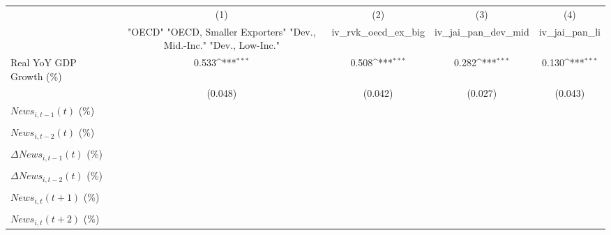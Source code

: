 {
\def\sym#1{\ifmmode^{#1}\else\(^{#1}\)\fi}
\begin{tabular}{l*{4}{c}}
\toprule
                    &\multicolumn{1}{c}{(1)}&\multicolumn{1}{c}{(2)}&\multicolumn{1}{c}{(3)}&\multicolumn{1}{c}{(4)}\\
                    &\multicolumn{1}{c}{ "OECD" "OECD, Smaller Exporters" "Dev., Mid.-Inc." "Dev., Low-Inc."}&\multicolumn{1}{c}{iv_rvk_oecd_ex_big}&\multicolumn{1}{c}{iv_jai_pan_dev_mid}&\multicolumn{1}{c}{iv_jai_pan_li}\\
\midrule
Real YoY GDP Growth (\%)&       0.533\sym{***}&       0.508\sym{***}&       0.282\sym{***}&       0.130\sym{***}\\
                    &     (0.048)         &     (0.042)         &     (0.027)         &     (0.043)         \\
\addlinespace
$ News_{i,t-1}(t)$ (\%)&                     &                     &                     &                     \\
                    &                     &                     &                     &                     \\
\addlinespace
$ News_{i,t-2}(t)$ (\%)&                     &                     &                     &                     \\
                    &                     &                     &                     &                     \\
\addlinespace
$ \Delta News_{i,t-1}(t)$ (\%)&                     &                     &                     &                     \\
                    &                     &                     &                     &                     \\
\addlinespace
$ \Delta News_{i,t-2}(t)$ (\%)&                     &                     &                     &                     \\
                    &                     &                     &                     &                     \\
\addlinespace
$ News_{i,t}(t+1)$ (\%)&                     &                     &                     &                     \\
                    &                     &                     &                     &                     \\
\addlinespace
$ News_{i,t}(t+2)$ (\%)&                     &                     &                     &                     \\

\end{tabular}}
